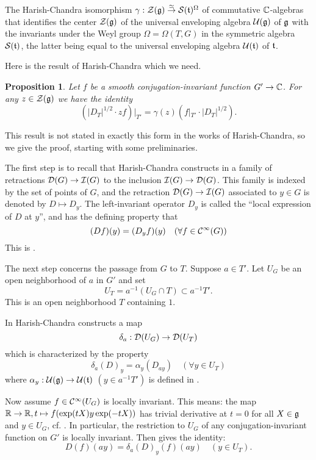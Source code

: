 \documentclass{article}
\newtheorem{pro}[thm]{Proposition}
\theoremstyle{definition}
\numberwithin{equation}{section}
\renewcommand{\-}{\hyp{}}
\begin{document}
The Harish-Chandra isomorphism  $\gamma : \mathcal{Z}(\mathfrak{g}) \overset\simeq\to \mathcal{S}(\mathfrak{t})^\Omega$ of commutative $\mathbb{C}$-algebras that identifies the center $\mathcal{Z}(\mathfrak{g})$ of the universal enveloping algebra $\mathcal{U}(\mathfrak{g})$  of $\mathfrak{g}$ with the invariants under the Weyl group $\Omega=\Omega(T,G)$ in the symmetric algebra $\mathcal{S}(\mathfrak{t})$, the latter being equal to the universal enveloping algebra $\mathcal{U}(\mathfrak{t})$ of $\mathfrak{t}$.

Here is the result of Harish-Chandra which we need.

\begin{pro} \label{pro:diff}
	Let $f$ be a smooth conjugation-invariant function $G' \to \mathbb{C}$. For any $z \in \mathcal{Z}(\mathfrak{g})$ we have the identity
	\[ (|D_T|^{1/2} \cdot zf)|_{T'} =  \gamma(z)(f|_{T'} \cdot |D_T|^{1/2}). \]
\end{pro}

This result is not stated in exactly  this form in the works of Harish-Chandra, so we give the proof, starting with some preliminaries.

The first step is to recall that Harish-Chandra constructs in \cite[\S4]{HC_characters} a family of retractions $\mathcal{D}(G) \to \mathcal{I}(G)$ to the inclusion $\mathcal{I}(G) \to \mathcal{D}(G)$. This family is indexed by the set of points of $G$, and the retraction $\mathcal{D}(G) \to \mathcal{I}(G)$ associated to $y \in G$ is denoted by $D \mapsto D_y$. The left-invariant operator $D_y$ is called the ``local expression of $D$ at $y$'', and has the defining property that 
\begin{equation} \label{eq:diff1}
 (Df)(y) = (D_yf)(y)\quad(\forall f \in \mathcal{C}^\infty(G))
\end{equation}
This is \cite[\S4, Corollary to Lemma 13, page 112]{HC_characters}.

The next step concerns the passage from $G$ to $T$. Suppose $a\in T'$. 
Let $U_G$ be an open neighborhood of $a$ in $G'$ and set
\[
\label{e:UT}
U_T = a^{-1}(U_G\cap T)\subset a^{-1}T'.
\]
This is an open neighborhood $T$ containing $1$.


 In \cite[\S 5]{HC_inv_eigen} Harish-Chandra constructs a map
\[ \delta_a : \mathcal{D}(U_G) \to \mathcal{D}(U_T)\]
which is characterized by the property 
\[  \delta_a(D)_y = \alpha_y(D_{ay}) \quad (\forall y \in U_T) \]
where $\alpha_y : \mathcal{U}(\mathfrak{g}) \to \mathcal{U}(\mathfrak{t})$ $(y\in a^{-1}T')$ is defined  in \cite[\S5, Corollary 1, page 463]{HC_inv_eigen}.


Now assume $f \in \mathcal{C}^\infty(U_G)$  is locally invariant. This means: the map $\mathbb{R} \to \mathbb{R}, t \mapsto f(\exp(tX)y\exp(-tX))$ has trivial derivative at $t=0$  for all $X \in \mathfrak{g}$ and $y \in U_G$, cf. \cite[\S8]{HC_inv_dist}. In particular, the restriction to $U_G$ of any conjugation-invariant function on $G'$ is locally invariant.
Then 
\cite[Lemma 18]{HC_inv_eigen} gives the identity:
\begin{equation} \label{eq:diff3}
	D(f)(ay) = \delta_a(D)_y(f)(ay)\quad(y\in U_T).
\end{equation}
\end{document}
